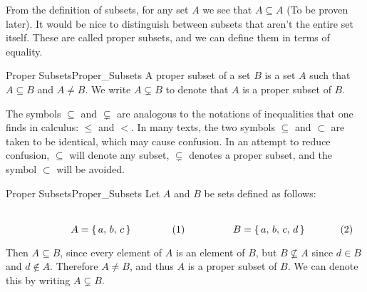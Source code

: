         From the definition of subsets, for any set $A$ we see that
        $A\subseteq{A}$ (To be proven later). It would be nice to distinguish
        between subsets that aren't the entire set itself. These are called
        proper subsets, and we can define them in terms of equality.
        \begin{fdefinition}{Proper Subsets}{Proper_Subsets}
            A \gls{proper subset} of a \gls{set} $B$ is a set $A$ such that
            $A\subseteq{B}$ and $A\ne{B}$. We write $A\subsetneq{B}$
            to denote that $A$ is a proper subset of $B$.
        \end{fdefinition}
        The symbols $\subseteq$ and $\subsetneq$ are analogous to the
        notations of inequalities that one finds in calculus: $\leq$ and $<$.
        In many texts, the two symbols $\subseteq$ and $\subset$ are taken to
        be identical, which may cause confusion. In an attempt to reduce
        confusion, $\subseteq$ will denote any subset, $\subsetneq$ denotes a
        proper subset, and the symbol $\subset$ will be avoided.
        \begin{lexample}{Proper Subsets}{Proper_Subsets}
            Let $A$ and $B$ be sets defined as follows:
            \par
            \begin{subequations}
                \begin{minipage}[b]{0.49\textwidth}
                    \centering
                    \begin{equation}
                        A=\{\,a,\,b,\,c\,\}
                    \end{equation}
                \end{minipage}
                \hfill
                \begin{minipage}[b]{0.49\textwidth}
                    \centering
                    \begin{equation}
                        B=\{\,a,\,b,\,c,\,d\,\}
                    \end{equation}
                \end{minipage}
            \end{subequations}
            \par\vspace{2.5ex}
            Then $A\subseteq{B}$, since every element of $A$ is an
            element of $B$, but $B\nsubseteq{A}$ since $d\in{B}$ and
            $d\notin{A}$. Therefore $A\ne{B}$, and thus $A$ is a proper
            subset of $B$. We can denote this by writing $A\subsetneq{B}$.
        \end{lexample}
